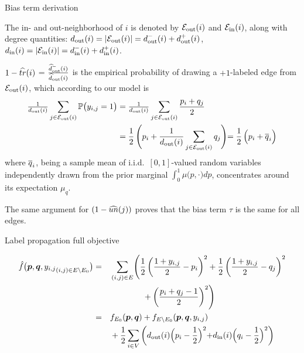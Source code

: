 \documentclass[10pt,svgnames,ignorenonframetext,final]{beamer}
\begin{document}
\appendix

\begin{frame}{Bias term derivation}

The in- and out-neighborhood of $i$ is denoted by $\mathcal{E}_{\mathrm{out}}(i)$ and $\mathcal{E}_{\mathrm{in}}(i)$,
along with degree quantities:
$d_{\mathrm{out}}(i)=|\mathcal{E}_{\mathrm{out}}(i)|=d_{\mathrm{out}}^-(i)+d_{\mathrm{out}}^+(i)$,\\
$d_{\mathrm{in}}(i)=|\mathcal{E}_{\mathrm{in}}(i)|=d_{\mathrm{in}}^-(i)+d_{\mathrm{in}}^+(i)$.
  
\(1-\widehat{tr}(i)\) = \(\frac{\widehat{d}_{\mathrm{out}}^-(i)}{\widehat{d}_{\mathrm{out}}(i)}\) is the empirical
probability of drawing a \(+1\)-labeled edge from \(\mathcal{E}_{\mathrm{out}}(i)\), which
according to our model is
\begin{align*}
  \tfrac{1}{d_{\mathrm{out}}(i)}\sum_{j\in \mathcal{E}_{\mathrm{out}}(i)} \mathbb{P}\big( y_{i,j} = 1 \big) &=
  \tfrac{1}{d_{\mathrm{out}}(i)}\sum_{j\in \mathcal{E}_{\mathrm{out}}(i)} \frac{p_i + q_j}{2} \\ &=
\frac{1}{2}\,\Biggl(p_i + \frac{1}{d_{\mathrm{out}}(i)}\sum_{j\in \mathcal{E}_{\mathrm{out}}(i)} q_j \Biggl)=
\frac{1}{2}\,\Bigl(p_i + \overline{q}_i\Bigl)
\end{align*}
where \(\overline{q}_i\), being a
sample mean of i.i.d.~\([0,1]\)-valued random variables independently
drawn from the prior marginal \(\int_0^1 \mu\big(p,\cdot\big) dp\),
concentrates around its expectation \(\mu_q\).

The same argument for $(1-\widehat{un}(j))$ proves that
the bias term \(\tau\) is the same for all edges.
\end{frame}

\begin{frame}{Label propagation full objective}

\begin{alignat*}{5}
{\hat f}\big(\boldsymbol{p},\boldsymbol{q},{y_{i,j}}_{(i,j) \in E\setminus E_0}\big) 
&= &&\sum_{(i,j) \in E} 
\Biggl(
  \frac{1}{2}\left(\frac{1+y_{i,j}}{2}-p_i\right)^2 +
  \frac{1}{2}\left(\frac{1+y_{i,j}}{2}-q_j\right)^2 \\
  &\, &&\qquad\qquad+ \left(\frac{p_i+q_j-1}{2}\right)^2
\Biggr)\\
&= &&f_{E_0}(\boldsymbol{p},\boldsymbol{q}) + f_{E\setminus E_0}(\boldsymbol{p},\boldsymbol{q}, {y_{i,j}}) \\
&\, &&+ \frac{1}{2}\sum_{i\in V}
\left(d_{\mathrm{out}}(i)\Bigl(p_i-\frac{1}{2}\Bigl)^2+d_{\mathrm{in}}(i)\Bigl(q_i-\frac{1}{2}\Bigl)^2\right) 
\end{alignat*}

\end{frame}
\end{document}
